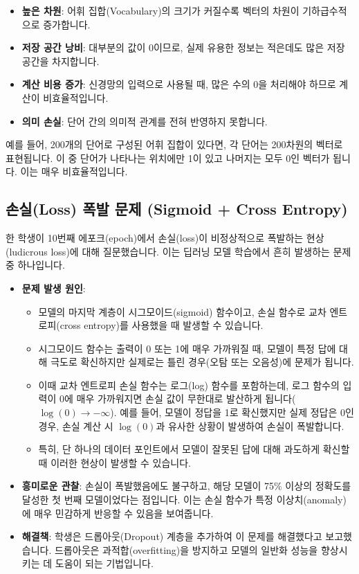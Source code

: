\documentclass[11pt,a4paper]{article}
\begin{document}
\begin{itemize}
    \item \textbf{높은 차원}: 어휘 집합(Vocabulary)의 크기가 커질수록 벡터의 차원이 기하급수적으로 증가합니다.
    \item \textbf{저장 공간 낭비}: 대부분의 값이 0이므로, 실제 유용한 정보는 적은데도 많은 저장 공간을 차지합니다.
    \item \textbf{계산 비용 증가}: 신경망의 입력으로 사용될 때, 많은 수의 0을 처리해야 하므로 계산이 비효율적입니다.
    \item \textbf{의미 손실}: 단어 간의 의미적 관계를 전혀 반영하지 못합니다.
\end{itemize}

\begin{examplebox}
예를 들어, 200개의 단어로 구성된 어휘 집합이 있다면, 각 단어는 200차원의 벡터로 표현됩니다. 이 중 단어가 나타나는 위치에만 1이 있고 나머지는 모두 0인 벡터가 됩니다. 이는 매우 비효율적입니다.
\end{examplebox}

\subsection{손실(Loss) 폭발 문제 (Sigmoid + Cross Entropy)}

한 학생이 10번째 에포크(epoch)에서 손실(loss)이 비정상적으로 폭발하는 현상(ludicrous loss)에 대해 질문했습니다. 이는 딥러닝 모델 학습에서 흔히 발생하는 문제 중 하나입니다.

\begin{itemize}
    \item \textbf{문제 발생 원인}:
        \begin{itemize}
            \item 모델의 마지막 계층이 시그모이드(sigmoid) 함수이고, 손실 함수로 교차 엔트로피(cross entropy)를 사용했을 때 발생할 수 있습니다.
            \item 시그모이드 함수는 출력이 0 또는 1에 매우 가까워질 때, 모델이 특정 답에 대해 극도로 확신하지만 실제로는 틀린 경우(오탐 또는 오음성)에 문제가 됩니다.
            \item 이때 교차 엔트로피 손실 함수는 로그(log) 함수를 포함하는데, 로그 함수의 입력이 0에 매우 가까워지면 손실 값이 무한대로 발산하게 됩니다($\log(0) \rightarrow -\infty$). 예를 들어, 모델이 정답을 1로 확신했지만 실제 정답은 0인 경우, 손실 계산 시 $\log(0)$과 유사한 상황이 발생하여 손실이 폭발합니다.
            \item 특히, 단 하나의 데이터 포인트에서 모델이 잘못된 답에 대해 과도하게 확신할 때 이러한 현상이 발생할 수 있습니다.
        \end{itemize}
    \item \textbf{흥미로운 관찰}: 손실이 폭발했음에도 불구하고, 해당 모델이 75\% 이상의 정확도를 달성한 첫 번째 모델이었다는 점입니다. 이는 손실 함수가 특정 이상치(anomaly)에 매우 민감하게 반응할 수 있음을 보여줍니다.
    \item \textbf{해결책}: 학생은 드롭아웃(Dropout) 계층을 추가하여 이 문제를 해결했다고 보고했습니다. 드롭아웃은 과적합(overfitting)을 방지하고 모델의 일반화 성능을 향상시키는 데 도움이 되는 기법입니다.
\end{itemize}
\end{document}
